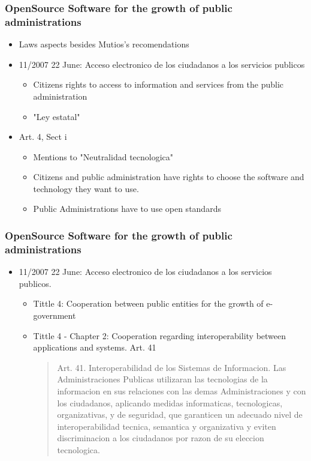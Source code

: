 \documentclass{beamer}
\begin{document}
\begin{frame}
\frametitle{ OpenSource Software for the growth of public administrations}

\begin{itemize}
\item Laws aspects besides Mutios's recomendations
\item 11/2007 22 June: Acceso electronico de los ciudadanos a los servicios publicos
\begin{itemize}
	\item Citizens rights to access to information and services from the public administration
	\item "Ley estatal"
\end{itemize}

\item  Art. 4, Sect i
\begin{itemize}
	\item Mentions to "Neutralidad tecnologica"
	\item Citizens and public administration have rights to choose the software and technology they want to use.
	\item Public Administrations have to use open standards 
\end{itemize}


\end{itemize}

\end{frame}

\begin{frame}
\frametitle{ OpenSource Software for the growth of public administrations}

\begin{itemize}
\item 11/2007 22 June: Acceso electronico de los ciudadanos a los servicios publicos. 
\begin{itemize}
	\item Tittle 4: Cooperation between public entities for the growth of e-government 
	
	\item Tittle 4 - Chapter 2: Cooperation regarding interoperability between applications and systems. Art. 41
	\begin {quote}
		Art. 41. Interoperabilidad de los Sistemas de Informacion. Las
Administraciones Publicas utilizaran las tecnologias de la informacion
en sus relaciones con las demas Administraciones y con los
ciudadanos, aplicando medidas informaticas, tecnologicas, organizativas, y de seguridad, que garanticen un adecuado nivel de
interoperabilidad tecnica, semantica y organizativa y eviten
discriminacion a los ciudadanos por razon de su eleccion tecnologica.

	\end {quote}
	
\end{itemize}


\end{itemize}

\end{frame}
\end{document}
